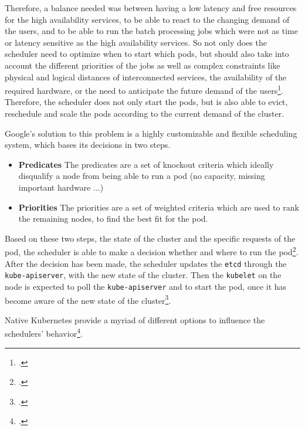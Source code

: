 Therefore, a balance needed was between having a low latency and free resources for the high availability services,
to be able to react to the changing demand of the users, and to be able to run the batch processing jobs which were not as
time or latency sensitive as the high availability services.
So not only does the scheduler need to optimize when to start which pods, but should also take into
account the different priorities of the jobs as well as complex constraints like physical and logical distances of interconnected services,
the availability of the required hardware, or the need to anticipate the future demand of the users\footcite{vermaLargescaleClusterManagement2015}.
Therefore, the scheduler does not only start the pods, but is also able to evict, reschedule and scale the pods according to the current demand of the cluster.

Google's solution to this problem is a highly customizable and flexible scheduling system, which bases its decisions in two steps.

\begin{itemize}
    \item \textbf{Predicates} The predicates are a set of knockout criteria which ideally disqualify a node from being able to run a pod (no capacity, missing important hardware ...)
    \item \textbf{Priorities} The priorities are a set of weighted criteria which are used to rank the remaining nodes, to find the best fit for the pod.
\end{itemize}

Based on these two steps, the state of the cluster and the specific requests of the pod, the scheduler is able
to make a decision whether and where to run the pod\footcite{zivukuInDepthAnalysisKubernetes2023}.
After the decision has been made, the scheduler updates the \texttt{etcd} through the \texttt{kube-apiserver},
with the new state of the cluster.
Then the \texttt{kubelet} on the node is expected to poll the \texttt{kube-apiserver} and to start the pod,
once it has become aware of the new state of the cluster\footcite{kubernetes-docsKubelet}.

Native Kubernetes provide a myriad of different options to influence the schedulers' behavior\footcite{rejibaCustomSchedulingKubernetes2023}.

